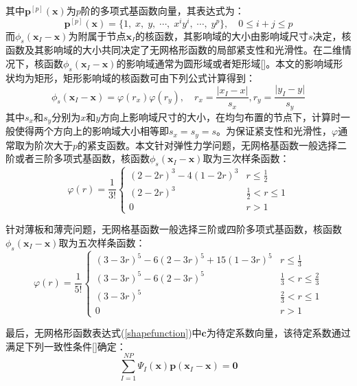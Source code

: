 其中$\pmb{p}^{[p]}(\pmb{x})$为$p$阶的多项式基函数向量，其表达式为：
\begin{equation}
    \pmb{p}^{[p]}(\pmb{x})=\{1,\;x,\;y,\;\dotsb,\;x^iy^i,\;\dotsb,\;y^p\},\quad 0\le i+j \le p
\end{equation}
而$\phi_s(\pmb{x}_I-\pmb{x})$为附属于节点$\pmb{x}_I$的核函数，其影响域的大小由影响域尺寸$s$决定，核函数及其影响域的大小共同决定了无网格形函数的局部紧支性和光滑性。在二维情况下，核函数$\phi_s(\pmb{x}_I-\pmb{x})$的影响域通常为圆形域或者矩形域[]。本文的影响域形状均为矩形，矩形影响域的核函数可由下列公式计算得到：
\begin{equation}
    \phi_s(\pmb{x}_I-\pmb{x})=\varphi(r_x)\varphi(r_y),\quad r_x=\frac{\lvert x_I-x\rvert}{s_x},r_y=\frac{\lvert y_I-y \rvert}{s_y}
\end{equation}
其中$s_x$和$s_y$分别为$x$和$y$方向上影响域尺寸的大小，在均匀布置的节点下，计算时一般使得两个方向上的影响域大小相等即$s_x=s_y=s$。为保证紧支性和光滑性，$\varphi$通常取为阶次大于$p$的紧支函数。本文针对弹性力学问题，无网格基函数一般选择二阶或者三阶多项式基函数，核函数$\phi_s(\pmb{x}_I-\pmb{x})$取为三次样条函数：
\begin{equation}\label{3B}
    \varphi(r)=\frac{1}{3!}
\begin{cases}
    (2-2r)^3-4(1-2r)^3 &r\le \frac{1}{2}\\
    (2-2r)^3&\frac{1}{2}<r\le 1\\
    0&r>1
\end{cases}
\end{equation}\par
针对薄板和薄壳问题，无网格基函数一般选择三阶或四阶多项式基函数，核函数$\phi_s(\pmb{x}_I-\pmb{x})$取为五次样条函数：
\begin{equation}
        \varphi(r)=\frac{1}{5!}
\begin{cases}
        (3-3r)^5-6(2-3r)^5+15(1-3r)^5&r\le\frac{1}{3}\\
        (3-3r)^5-6(2-3r)^5&\frac{1}{3}<r\le\frac{2}{3}\\
        (3-3r)^5&\frac{2}{3}<r\le1\\
        0&r>1
\end{cases}
\end{equation}\par
最后，无网格形函数表达式(\ref{shapefunction})中$\pmb{c}$为待定系数向量，该待定系数通过满足下列一致性条件[]确定：
\begin{equation}\label{regeneration conditions}
    \sum_{I=1}^{N\!P}\Psi_I(\pmb{x})\pmb{p}(\pmb{x}_I-\pmb{x})=\pmb{0}
\end{equation}
